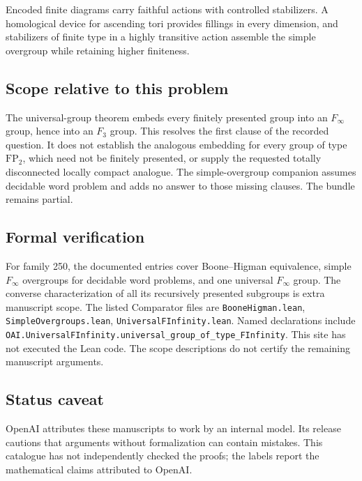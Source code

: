 \documentclass[11pt]{article}
\begin{document}
Encoded finite diagrams carry faithful actions with controlled stabilizers. A homological device for ascending tori provides fillings in every dimension, and stabilizers of finite type in a highly transitive action assemble the simple overgroup while retaining higher finiteness.

\subsection{Scope relative to this problem}
The universal-group theorem embeds every finitely presented group into an $F_\infty$ group, hence into an $F_3$ group. This resolves the first clause of the recorded question. It does not establish the analogous embedding for every group of type $\mathrm{FP}_2$, which need not be finitely presented, or supply the requested totally disconnected locally compact analogue. The simple-overgroup companion assumes decidable word problem and adds no answer to those missing clauses. The bundle remains partial.

\subsection{Formal verification}
For family 250, the documented entries cover Boone--Higman equivalence, simple $F_\infty$ overgroups for decidable word problems, and one universal $F_\infty$ group. The converse characterization of all its recursively presented subgroups is extra manuscript scope. The listed Comparator files are \texttt{BooneHigman.lean}, \texttt{SimpleOvergroups.lean}, \texttt{UniversalFInfinity.lean}. Named declarations include \texttt{OAI.UniversalFInfinity.universal\_group\_of\_type\_FInfinity}. This site has not executed the Lean code. The scope descriptions do not certify the remaining manuscript arguments.

\subsection{Status caveat}
OpenAI attributes these manuscripts to work by an internal model. Its release cautions that arguments without formalization can contain mistakes. This catalogue has not independently checked the proofs; the labels report the mathematical claims attributed to OpenAI.
\end{document}
